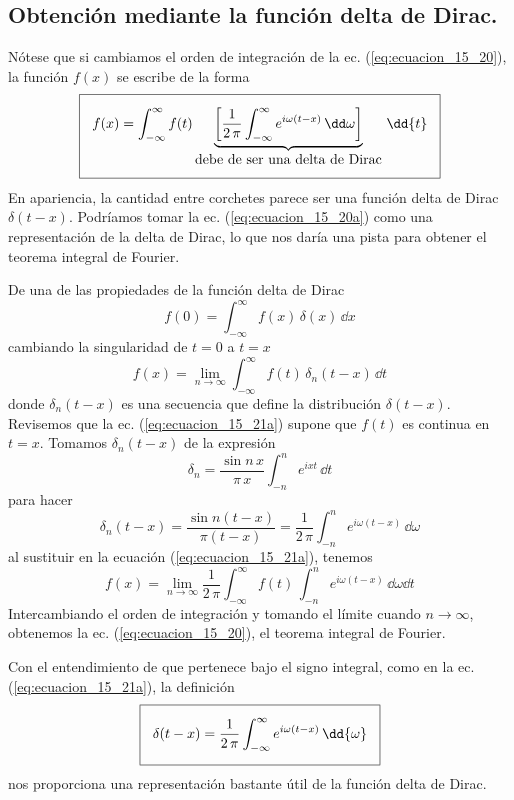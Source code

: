 \subsection{Obtención mediante la función delta de Dirac.}
Nótese que si cambiamos el orden de integración de la ec. (\ref{eq:ecuacion_15_20}), la función $f(x)$ se escribe de la forma
\begin{align}
\setlength{\fboxsep}{3\fboxsep}\boxed{f(x)= \int_{-\infty}^{\infty} f(t) \underbrace{ \left[ \dfrac{1}{2 \, \pi} \int_{-\infty}^{\infty} e^{i \omega(t - x)} \, \dd \omega \right] }_{\mbox{debe de ser una delta de Dirac}} \, \dd{t}} 
\label{eq:ecuacion_15_20a}
\end{align}
En apariencia, la cantidad entre corchetes parece ser una función delta de Dirac $\delta (t - x)$. Podríamos tomar la ec. (\ref{eq:ecuacion_15_20a}) como una representación de la delta de Dirac, lo que nos daría una pista para obtener el teorema integral de Fourier.
\par
De una de las propiedades de la función delta de Dirac
\[ f(0) = \int_{-\infty}^{\infty} f(x) \, \delta(x) \, \dd x \]
cambiando la singularidad de $t = 0$ a $t = x$
\begin{equation}
f(x) = \lim_{n \to \infty} \int_{-\infty}^{\infty} f(t) \, \delta_{n} (t - x) \, \dd{t}
\label{eq:ecuacion_15_21a} 
\end{equation}
donde $\delta_{n}(t - x)$ es una secuencia que define la distribución $\delta(t - x)$. Revisemos que la ec. (\ref{eq:ecuacion_15_21a}) supone que $f(t)$ es continua en $t = x$. Tomamos $\delta_{n} (t - x)$  de la expresión
\[ \delta_{n} = \dfrac{\sin n \, x}{\pi \, x} \int_{-n}^{n} e^{i x t} \, \dd{t} \]
para hacer
\begin{equation}
\delta_{n} (t - x) = \dfrac{\sin n (t - x)}{\pi (t - x)} = \dfrac{1}{2 \, \pi} \int_{-n}^{n} e^{i \omega (t - x)} \, \dd{\omega}
\label{eq:ecuacion_15_21b}
\end{equation}
al sustituir en la ecuación (\ref{eq:ecuacion_15_21a}), tenemos
\begin{equation}
f(x) = \lim_{n \to \infty} \dfrac{1}{2 \, \pi} \int_{-\infty}^{\infty} f(t) \, \int_{-n}^{n} e^{i \omega (t - x)} \, \dd{\omega} \dd{t}
\label{eq:ecuacion_15_21c}
\end{equation}
Intercambiando el orden de integración y tomando el límite cuando $n \to \infty$, obtenemos la ec. (\ref{eq:ecuacion_15_20}), el teorema integral de Fourier.
\par
Con el entendimiento de que pertenece bajo el signo integral, como en la ec. (\ref{eq:ecuacion_15_21a}), la definición
\begin{equation}
\setlength{\fboxsep}{3\fboxsep}\boxed{\delta(t - x) = \dfrac{1}{2 \, \pi} \int_{-\infty}^{\infty} e^{i \omega (t - x)} \, \dd{\omega}}
\label{eq:ecuacion_15_21d}
\end{equation}
nos proporciona una representación bastante útil de la función delta de Dirac.

